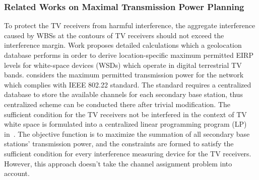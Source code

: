 


\subsubsection*{Related Works on Maximal Transmission Power Planning}
\label{MPowerPlanning}
  
To protect the TV receivers from harmful interference, the aggregate interference caused by WBSs at the contours of TV receivers should not exceed the interference margin.
Work \cite{maximum_power_TVWS_dyspan_2011} proposes detailed calculations which a geolocation database performs in order to derive location-specific maximum permitted EIRP levels for white-space devices (WSDs) which operate in digital terrestrial TV bands.
\cite{multipleIntf_pimrc11} considers the maximum permitted transmission power for the network which complies with IEEE 802.22 standard. 
The standard requires a centralized database to store the available channels for each secondary base station, thus centralized scheme can be conducted there after trivial modification.
The sufficient condition for the TV receivers not be interfered in the context of TV white space is formulated into a centralized linear programming program (\gls{LP}) in~\cite{multipleIntf_pimrc11}.
The objective function is to maximize the summation of all secondary base stations' transmission power, and the constraints are formed to satisfy the sufficient condition for every interference measuring device for the TV receivers. 
However, this approach doesn't take the channel assignment problem into account.



